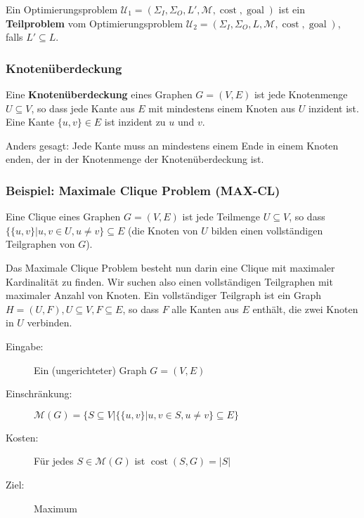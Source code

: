 \begin{definition}
Ein Optimierungsproblem $\mathcal{U}_1 = (\Sigma_I, \Sigma_O, L', \mathcal{M}, \operatorname{cost}, \operatorname{goal})$ ist ein \textbf{Teilproblem} vom Optimierungsproblem $\mathcal{U}_2 = (\Sigma_I, \Sigma_O, L, \mathcal{M}, \operatorname{cost}, \operatorname{goal})$, falls $L' \subseteq L$.
\end{definition}

\subsubsection{Knotenüberdeckung}
\label{sec:knotenueberdeckung}
\begin{definition}
Eine \textbf{Knotenüberdeckung} eines Graphen $G = (V, E)$ ist jede Knotenmenge $U \subseteq V$, so dass jede Kante aus $E$ mit mindestens einem Knoten aus $U$ inzident ist. Eine Kante $\{u, v\} \in E$ ist inzident zu $u$ und $v$.

Anders gesagt: Jede Kante muss an mindestens einem Ende in einem Knoten enden, der in der Knotenmenge der Knotenüberdeckung ist.
\end{definition}

\subsubsection{Beispiel: Maximale Clique Problem (MAX-CL)}
\begin{definition}
Eine Clique eines Graphen $G = (V, E)$ ist jede Teilmenge $U \subseteq V$, so dass $\{\{u, v\} | u, v \in U, u \not= v\} \subseteq E$ (die Knoten von $U$ bilden einen vollständigen Teilgraphen von $G$).
\end{definition}

Das Maximale Clique Problem besteht nun darin eine Clique mit maximaler Kardinalität zu finden. Wir suchen also einen vollständigen Teilgraphen mit maximaler Anzahl von Knoten. Ein vollständiger Teilgraph ist ein Graph $H = (U, F), U \subseteq V, F \subseteq E$, so dass $F$ alle Kanten aus $E$ enthält, die zwei Knoten in $U$ verbinden.

\begin{description}
  \item[Eingabe:] Ein (ungerichteter) Graph $G = (V, E)$
  \item[Einschränkung:] $\mathcal{M}(G) = \{S \subseteq V | \{\{u, v\} | u, v \in S, u \not= v\} \subseteq E\}$
  \item[Kosten:] Für jedes $S \in \mathcal{M}(G)$ ist $\operatorname{cost}(S, G) = |S|$
  \item[Ziel:] Maximum
\end{description}

